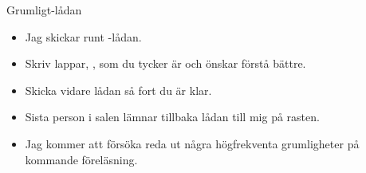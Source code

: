 





\ifkompendium\else
\begin{SlideExtra}{Grumligt-lådan}
\begin{itemize}
\item Jag skickar runt -lådan.
\item Skriv lappar, , som du tycker är  och  önskar förstå bättre.
\item Skicka vidare lådan så fort du är klar.
\item Sista person i salen lämnar tillbaka lådan till mig på rasten.
\item Jag kommer att försöka reda ut några högfrekventa grumligheter på kommande föreläsning.
\end{itemize}
\end{SlideExtra}
\fi